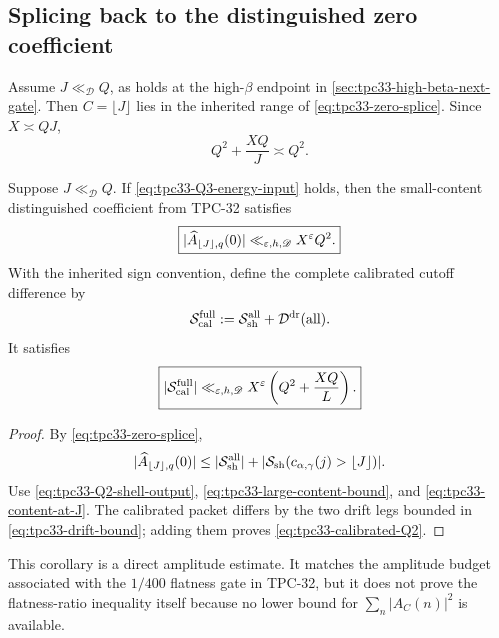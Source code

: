\subsection{Splicing back to the distinguished zero coefficient}

Assume \(J\ll_{\mathscr D}Q\), as holds at the high-\(\beta\) endpoint in
\cref{sec:tpc33-high-beta-next-gate}.  Then \(C=\lfloor J\rfloor\) lies in the
inherited range of \eqref{eq:tpc33-zero-splice}.  Since \(X\asymp QJ\),
\begin{equation}
 Q^2+\frac{XQ}{J}\asymp Q^2.
 \label{eq:tpc33-content-at-J}
\end{equation}

\begin{corollary}
\label{cor:tpc33-zero-frequency-closure}
Suppose \(J\ll_{\mathscr D}Q\).  If
\eqref{eq:tpc33-Q3-energy-input} holds, then the small-content
distinguished coefficient from TPC-32 satisfies
\begin{equation}
 \boxed{
 |\widehat A_{\lfloor J\rfloor,q}(0)|
 \ll_{\varepsilon,h,\mathscr D}X^\varepsilon Q^2.}
 \label{eq:tpc33-zero-frequency-Q2}
\end{equation}
With the inherited sign convention, define the complete calibrated cutoff
difference by
\begin{equation}
 \mathcal S_{\rm cal}^{\rm full}
 :=\mathcal S_{\rm sh}^{\rm all}+\mathcal D^{\rm dr}(\text{all}).
 \label{eq:tpc33-calibrated-full-definition}
\end{equation}
It satisfies
\begin{equation}
 \boxed{
 |\mathcal S_{\rm cal}^{\rm full}|
 \ll_{\varepsilon,h,\mathscr D}X^\varepsilon
 \left(Q^2+\frac{XQ}{L}\right).}
 \label{eq:tpc33-calibrated-Q2}
\end{equation}
\end{corollary}

\begin{proof}
By \eqref{eq:tpc33-zero-splice},
\[
 |\widehat A_{\lfloor J\rfloor,q}(0)|
 \le |\mathcal S_{\rm sh}^{\rm all}|
   +|\mathcal S_{\rm sh}(c_{\alpha,\gamma}(j)>\lfloor J\rfloor)|.
\]
Use \eqref{eq:tpc33-Q2-shell-output},
\eqref{eq:tpc33-large-content-bound}, and
\eqref{eq:tpc33-content-at-J}.  The calibrated packet differs by the two
drift legs bounded in \eqref{eq:tpc33-drift-bound}; adding them proves
\eqref{eq:tpc33-calibrated-Q2}.
\end{proof}

This corollary is a direct amplitude estimate.  It matches the amplitude
budget associated with the \(1/400\) flatness gate in TPC-32, but it does
not prove the flatness-ratio inequality itself because no lower bound for
\(\sum_n|A_C(n)|^2\) is available.
